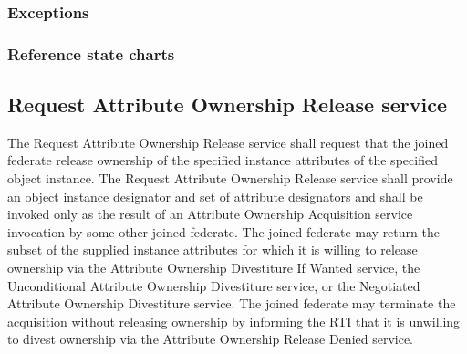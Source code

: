 \begin{compactstdpage}


    \subsubsection{Exceptions}



    \subsubsection{Reference state charts}



    \subsection{Request Attribute Ownership Release \rtiinitiated{} service}


    The Request Attribute Ownership Release \rtiinitiated{} service shall request that the joined federate release ownership of the specified instance attributes of the specified object instance. The Request Attribute Ownership Release \rtiinitiated{} service shall provide an object instance designator and set of attribute designators and shall be invoked only as the result of an Attribute Ownership Acquisition service invocation by some other joined federate. The joined federate may return the subset of the supplied instance attributes for which it is willing to release ownership via the Attribute Ownership Divestiture If Wanted service, the Unconditional Attribute Ownership Divestiture service, or the Negotiated Attribute Ownership Divestiture service. The joined federate may terminate the acquisition without releasing ownership by informing the RTI that it is unwilling to divest ownership via the Attribute Ownership Release Denied service.


\end{compactstdpage}
